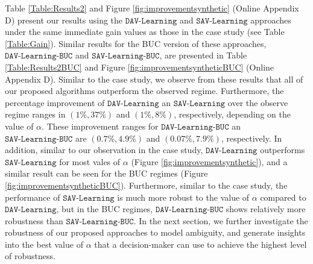 \documentclass[opre,nonblindrev]{informs2}%
\newcommand{\1}{\hbox{\rm 1\kern-.35em 1}}
\newcommand{\SAV}{\texttt{SAV-Learning}}
\newcommand{\DAV}{\texttt{DAV-Learning}}
\newcommand{\SAVBUC}{\texttt{SAV-Learning-BUC}}
\newcommand{\DAVBUC}{\texttt{DAV-Learning-BUC}}
\begin{document}
Table \ref{Table:Results2} and Figure \ref{fig:improvementsynthetic} (Online Appendix D) present our results using the $\DAV$ and $\SAV$ approaches under the same immediate gain values as those in the case study (see Table  \ref{Table:Gain}). Similar results for the BUC version of these approaches, $\DAVBUC$ and $\SAVBUC$, are presented in Table \ref{Table:Results2BUC} and Figure \ref{fig:improvementsyntheticBUC} (Online Appendix D). Similar to the case study, we observe from these results that  all of our  proposed algorithms outperform the observed regime. Furthermore, the percentage improvement of $\DAV$ an $\SAV$ over the observe regime ranges in $(1\%, 37\%)$  and $(1\%, 8\%)$, respectively, depending on the value of $\alpha$.  These improvement ranges for $\DAVBUC$ an $\SAVBUC$ are $(0.7\%, 4.9\%)$ and $(0.07\%, 7.9\%)$, respectively. In addition, similar to our observation in the case study, $\DAV$  outperforms $\SAV$  for most vales of $\alpha$ (Figure \ref{fig:improvementsynthetic}), and a similar result can be seen for the BUC regimes (Figure \ref{fig:improvementsyntheticBUC}). Furthermore, similar to the case study, the performance of $\SAV$   is much more robust to the value of $\alpha$ compared to $\DAV$, but in the BUC regimes, $\DAVBUC$ shows relatively more robustness than $\SAVBUC$. In the next section, we further investigate the robustness of our proposed approaches to model ambiguity, and generate insights into the best value of   $\alpha$ that a decision-maker can use to achieve the highest level of robustness.
\end{document}
